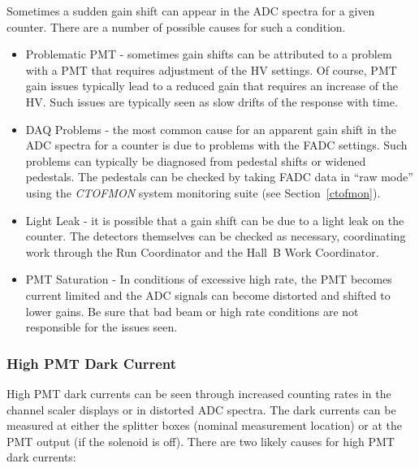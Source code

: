 \documentclass[12pt]{article}
\begin{document}
Sometimes a sudden gain shift can appear in the ADC spectra for a given counter. 
There are a number of possible causes for such a condition.

\begin{itemize}
\item Problematic PMT - sometimes gain shifts can be attributed to a problem with a 
PMT that requires adjustment of the HV settings. Of course, PMT gain issues typically 
lead to a reduced gain that requires an increase of the HV.  Such issues are typically 
seen as slow drifts of the response with time.
\item DAQ Problems - the most common cause for an apparent gain shift in the ADC 
spectra for a counter is due to problems with the FADC settings. Such problems can 
typically be diagnosed from pedestal shifts or widened pedestals. The pedestals can be 
checked by taking FADC data in ``raw mode'' using the {\it CTOFMON} system monitoring 
suite (see Section~\ref{ctofmon}).
\item Light Leak - it is possible that a gain shift can be due to a light leak on the 
counter. The detectors themselves can be checked as necessary, coordinating work 
through the Run Coordinator and the Hall~B Work Coordinator.
\item PMT Saturation - In conditions of excessive high rate, the PMT becomes current 
limited and the ADC signals can become distorted and shifted to lower gains. Be sure 
that bad beam or high rate conditions are not responsible for the issues seen.
\end{itemize}

\subsubsection{High PMT Dark Current}
\label{high-current}

High PMT dark currents can be seen through increased counting rates in the channel 
scaler displays or in distorted ADC spectra. The dark currents can be measured at 
either the splitter boxes (nominal measurement location) or at the PMT output (if 
the solenoid is off). There are two likely causes for high PMT dark currents:
\end{document}
